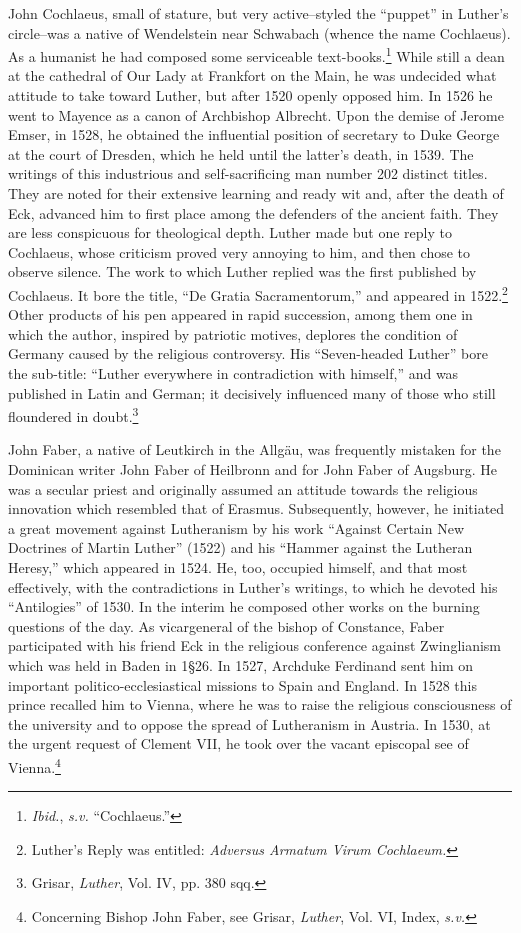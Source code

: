 John Cochlaeus, small of stature, but very active--styled the “puppet”
in Luther’s circle--was a native of Wendelstein near Schwabach
(whence the name Cochlaeus). As a humanist he had composed some
serviceable text-books.\footnote{\textit{Ibid.}, \textit{s.v.} “Cochlaeus.”}
While still a dean at the cathedral of Our
Lady at Frankfort on the Main, he was undecided what attitude to
take toward Luther, but after 1520 openly opposed him. In 1526 he
went to Mayence as a canon of Archbishop Albrecht. Upon the
demise of Jerome Emser, in 1528, he obtained the influential position
of secretary to Duke George at the court of Dresden, which he held
until the latter’s death, in 1539. The writings of this industrious and
self-sacrificing man number 202 distinct titles. They are noted for
their extensive learning and ready wit and, after the death of Eck,
advanced him to first place among the defenders of the ancient faith.
They are less conspicuous for theological depth. Luther made but one
reply to Cochlaeus, whose criticism proved very annoying to him,
and then chose to observe silence. The work to which Luther replied
was the first published by Cochlaeus. It bore the title, “De Gratia
Sacramentorum,” and appeared in 1522.\footnote
{Luther’s Reply was entitled: \textit{Adversus Armatum Virum Cochlaeum.}}
Other products of his pen
appeared in rapid succession, among them one in which the author,
inspired by patriotic motives, deplores the condition of Germany
caused by the religious controversy. His “Seven-headed Luther” bore
the sub-title: “Luther everywhere in contradiction with himself,”
and was published in Latin and German; it decisively influenced many
of those who still floundered in doubt.\footnote
{Grisar, \textit{Luther}, Vol. IV, pp. 380 sqq.}

John Faber, a native of Leutkirch in the Allgäu, was frequently
mistaken for the Dominican writer John Faber of Heilbronn and
for John Faber of Augsburg. He was a secular priest and originally
assumed an attitude towards the religious innovation which resembled
that of Erasmus. Subsequently, however, he initiated a great movement against
Lutheranism by his work “Against Certain New Doctrines of Martin Luther”
(1522) and his “Hammer against the Lutheran Heresy,” which appeared in
1524. He, too, occupied himself,
and that most effectively, with the contradictions in Luther’s writings,
to which he devoted his “Antilogies” of 1530. In the interim he composed
other works on the burning questions of the day. As vicargeneral of the
bishop of Constance, Faber participated with his friend
Eck in the religious conference against Zwinglianism which was held
in Baden in 1§26. In 1527, Archduke Ferdinand sent him on important politico-ecclesiastical
missions to Spain and England. In 1528
this prince recalled him to Vienna, where he was to raise the religious
consciousness of the university and to oppose the spread of Lutheranism
in Austria. In 1530, at the urgent request of Clement VII, he
took over the vacant episcopal see of Vienna.\footnote
{Concerning Bishop John Faber, see Grisar, \textit{Luther}, Vol. VI, Index, \textit{s.v.}}

